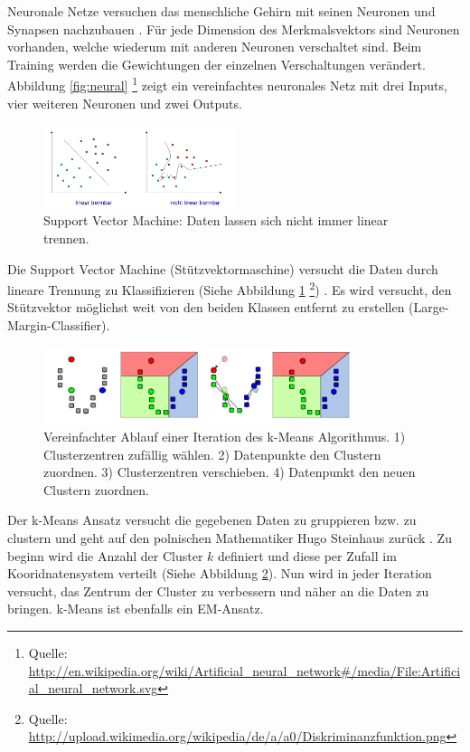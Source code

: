 Neuronale Netze versuchen das menschliche Gehirn mit seinen Neuronen und Synapsen nachzubauen \cite{neuron}. Für jede Dimension des Merkmalsvektors sind Neuronen vorhanden, welche wiederum mit anderen Neuronen verschaltet sind. Beim Training werden die Gewichtungen der einzelnen Verschaltungen verändert.
Abbildung \ref{fig:neural} \footnote{Quelle: \url{http://en.wikipedia.org/wiki/Artificial_neural_network\#/media/File:Artificial_neural_network.svg}} zeigt ein vereinfachtes neuronales Netz mit drei Inputs, vier weiteren Neuronen und zwei Outputs.

\begin{figure}[htbp] \centering
    \includegraphics[width=0.5\textwidth]{Bilder/Kap1/svm}
    \caption{ Support Vector Machine: Daten lassen sich nicht immer linear trennen.}
    \label{fig:svm}
\end{figure}

Die Support Vector Machine (Stützvektormaschine) versucht die Daten durch lineare Trennung zu Klassifizieren (Siehe Abbildung \ref{fig:svm} \footnote{Quelle: \url{http://upload.wikimedia.org/wikipedia/de/a/a0/Diskriminanzfunktion.png}})
\cite{svm}. Es wird versucht, den Stützvektor möglichst weit von den beiden Klassen entfernt zu erstellen (Large-Margin-Classifier).

\begin{figure}[htbp] \centering
    \includegraphics[width=0.8\textwidth]{Bilder/Kap1/kmeans}
    \caption{ Vereinfachter Ablauf einer Iteration des k-Means Algorithmus. 1) Clusterzentren zufällig wählen. 2) Datenpunkte den  Clustern zuordnen. 3) Clusterzentren verschieben. 4) Datenpunkt den neuen Clustern zuordnen.}
    \label{fig:kmeans}
\end{figure}

Der k-Means Ansatz versucht die gegebenen Daten zu gruppieren bzw. zu clustern und geht auf den polnischen Mathematiker Hugo Steinhaus zurück \cite{kmeans}. Zu beginn wird die Anzahl der Cluster $k$ definiert und diese per Zufall im Kooridnatensystem verteilt (Siehe Abbildung \ref{fig:kmeans}). Nun wird in jeder Iteration versucht, das Zentrum der Cluster zu verbessern und näher an die Daten zu bringen. k-Means ist ebenfalls ein EM-Ansatz.


